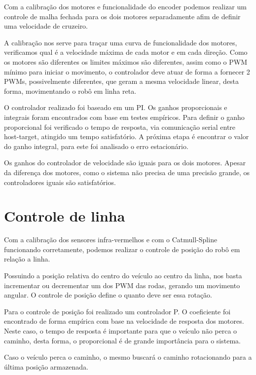 \documentclass{article}
\begin{document}
Com a calibração dos motores e funcionalidade do encoder podemos realizar um controle de malha fechada para os dois motores separadamente afim de definir uma velocidade de cruzeiro.

A calibração nos serve para traçar uma curva de funcionalidade dos motores, verificamos qual é a velocidade máxima de cada motor e em cada direção. Como os motores são diferentes os limites máximos são diferentes, assim como o PWM mínimo para iniciar o movimento, o controlador deve atuar de forma a fornecer 2 PWMs, possivelmente diferentes, que geram a mesma velocidade linear, desta forma, movimentando o robô em linha reta.

O controlador realizado foi baseado em um PI. Os ganhos proporcionais e integrais foram encontrados com base em testes empíricos. Para definir o ganho proporcional foi verificado o tempo de resposta, via comunicação serial entre {host}-{target}, atingido um tempo satisfatório. A próxima etapa é encontrar o valor do ganho integral, para este foi analisado o erro estacionário. 

Os ganhos do controlador de velocidade são iguais para os dois motores. Apesar da diferença dos motores, como o sistema não precisa de uma precisão grande, os controladores iguais são satisfatórios.

\section{Controle de linha}

Com a calibração dos sensores infra-vermelhos e com o Catmull-Spline funcionando corretamente, podemos realizar o controle de posição do robô em relação a linha.

Possuindo a posição relativa do centro do veículo ao centro da linha, nos basta incrementar ou decrementar um dos PWM das rodas, gerando um movimento angular. O controle de posição define o quanto deve ser essa rotação.

Para o controle de posição foi realizado um controlador P. O coeficiente foi encontrado de forma empírica com base na velocidade de resposta dos motores. Neste caso, o tempo de resposta é importante para que o veículo não perca o caminho, desta forma, o proporcional é de grande importância para o sistema.

Caso o veículo perca o caminho, o mesmo buscará o caminho rotacionando para a última posição armazenada.

\begin{thebibliography}{widestlabel}
\end{thebibliography}
\pagebreak
\end{document}
